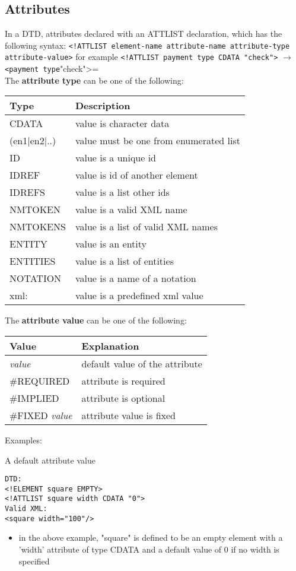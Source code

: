 \documentclass[11pt]{article}
\begin{document}
\subsection{Attributes}
\label{sec:orgeb26731}
In a DTD, attributes declared with an ATTLIST declaration, which has the following syntax: \texttt{<!ATTLIST element-name attribute-name attribute-type attribute-value>} for example \texttt{<!ATTLIST payment type CDATA "check">} \(\rightarrow\) \texttt{<payment type}"check">=\\
The \textbf{attribute type} can be one of the following:
\begin{center}
\begin{tabular}{ll}
Type & Description\\
\hline
CDATA & value is character data\\
(en1\(\vert{}\)en2\(\vert{}\)..) & value must be one from enumerated list\\
ID & value is a unique id\\
IDREF & value is id of another element\\
IDREFS & value is a list other ids\\
NMTOKEN & value is a valid XML name\\
NMTOKENS & value is a list of valid XML names\\
ENTITY & value is an entity\\
ENTITIES & value is a list of entities\\
NOTATION & value is a name of a notation\\
xml: & value is a predefined xml value\\
\end{tabular}
\end{center}
The \textbf{attribute value} can be one of the following:
\begin{center}
\begin{tabular}{ll}
Value & Explanation\\
\hline
\emph{value} & default value of the attribute\\
\#REQUIRED & attribute is required\\
\#IMPLIED & attribute is optional\\
\#FIXED \emph{value} & attribute value is fixed\\
\end{tabular}
\end{center}

Examples:

A default attribute value
\lstset{breaklines=true,language=XML,label= ,caption= ,captionpos=b,numbers=none}
\begin{lstlisting}
DTD:
<!ELEMENT square EMPTY>
<!ATTLIST square width CDATA "0">
Valid XML:
<square width="100"/>
\end{lstlisting}
\begin{itemize}
\item in the above example, "square" is defined to be an empty element with a 'width' attribute of type CDATA and a default value of 0 if no width is specified
\end{itemize}
\end{document}
